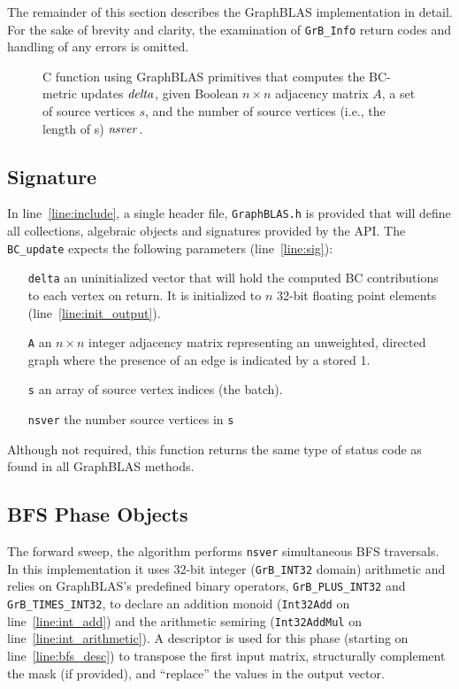 The remainder of this section describes the 
GraphBLAS implementation in detail.  
For the sake of brevity and clarity, the examination of 
{\tt GrB\_Info} return codes and handling of any errors is omitted.


\begin{figure*}[h]
\caption{C function using GraphBLAS primitives that computes the BC-metric
updates ${\it delta}$, given Boolean $n \times n$ adjacency matrix $A$, a
set of source vertices $s$, and the number of source vertices (i.e., the 
length of s) ${\it nsver}$.}
\label{Fig:BClisting}
{\scriptsize

}
\end{figure*}

\subsection{Signature}

In line~\ref{line:include}, a single header file, {\tt GraphBLAS.h} is provided
that will define all collections, algebraic objects and signatures provided by the
API. The {\tt BC\_update} expects the following parameters (line~\ref{line:sig}):

\begin{itemize} [leftmargin=0.6in]
\item[\tt delta] an uninitialized vector that will hold the computed BC contributions to each
                 vertex on return.  It is initialized to $n$ 32-bit floating
                 point elements (line~\ref{line:init_output}).
\item[\tt A]     an $n\times n$ integer adjacency matrix representing an
                 unweighted, directed graph where the presence of an edge
                 is indicated by a stored 1.
\item[\tt s]     an array of source vertex indices (the batch).
\item[\tt nsver] the number source vertices in {\tt s}
\end{itemize}
\noindent
Although not required, this function returns the same type of status code as
found in all GraphBLAS methods.

\subsection{BFS Phase Objects}
 
The forward sweep, the algorithm performs {\tt nsver} simultaneous BFS traversals.  In this
implementation it uses 32-bit integer ({\tt GrB\_INT32} domain) arithmetic and
relies on GraphBLAS's predefined binary operators, {\tt GrB\_PLUS\_INT32} and 
{\tt GrB\_TIMES\_INT32}, to declare an addition monoid ({\tt Int32Add} on line~\ref{line:int_add})
and the arithmetic semiring ({\tt Int32AddMul} on line~\ref{line:int_arithmetic}).
A descriptor is used for this phase (starting on line~\ref{line:bfs_desc})
to transpose the first input matrix, structurally complement the mask (if provided),
and ``replace'' the values in the output vector.

